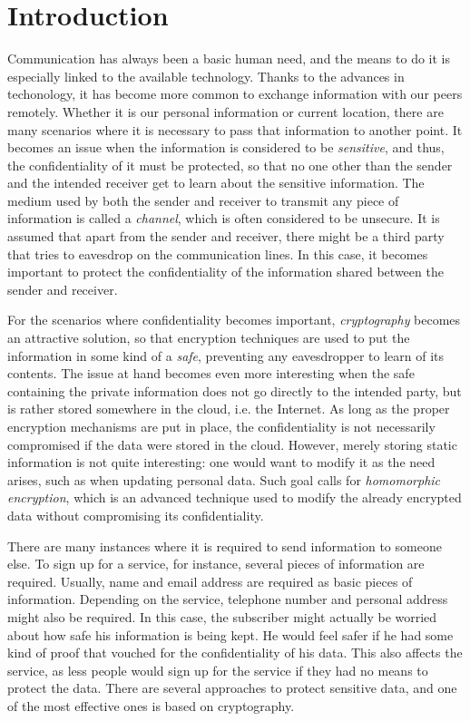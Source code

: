 \chapter{Introduction}
\label{intro}

Communication has always been a basic human need, and the means to do it is especially linked to the available technology. Thanks to the advances in techonology, it has become more common to exchange information with our peers remotely. Whether it is our personal information or current location, there are many scenarios where it is necessary to pass that information to another point. It becomes an issue when the information is considered to be \emph{sensitive}, and thus, the confidentiality of it must be protected, so that no one other than the sender and the intended receiver get to learn about the sensitive information. The medium used by both the sender and receiver to transmit any piece of information is called a \emph{channel}, which is often considered to be unsecure. It is assumed that apart from the sender and receiver, there might be a third party that tries to eavesdrop on the communication lines. In this case, it becomes important to protect the confidentiality of the information shared between the sender and receiver. 

For the scenarios where confidentiality becomes important, \emph{cryptography} becomes an attractive solution, so that encryption techniques are used to put the information in some kind of a \emph{safe}, preventing any eavesdropper to learn of its contents. The issue at hand becomes even more interesting when the safe containing the private information does not go directly to the intended party, but is rather stored somewhere in the cloud, i.e. the Internet. As long as the proper encryption mechanisms are put in place, the confidentiality is not necessarily compromised if the data were stored in the cloud. However, merely storing static information is not quite interesting: one would want to modify it as the need arises, such as when updating personal data. Such goal calls for \emph{homomorphic encryption}, which is an advanced technique used to modify the already encrypted data without compromising its confidentiality.

There are many instances where it is required to send information to someone else. To sign up for a service, for instance, several pieces of information are required. Usually, name and email address are required as basic pieces of information. Depending on the service, telephone number and personal address might also be required. In this case, the subscriber might actually be worried about how safe his information is being kept. He would feel safer if he had some kind of proof that vouched for the confidentiality of his data. This also affects the service, as less people would sign up for the service if they had no means to protect the data. There are several approaches to protect sensitive data, and one of the most effective ones is based on cryptography.

